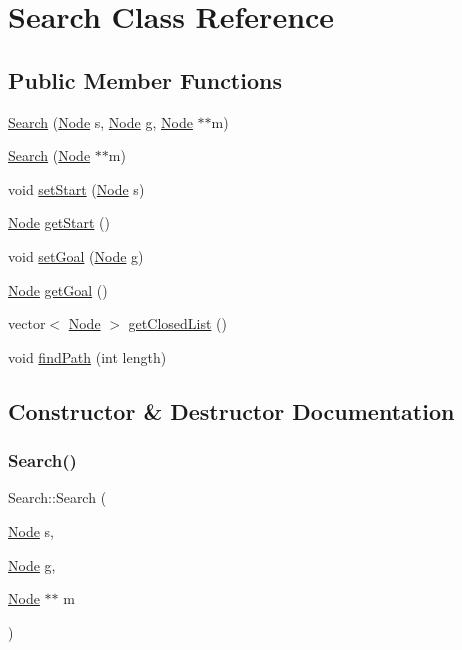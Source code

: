 \hypertarget{classSearch}{}\section{Search Class Reference}
\label{classSearch}
\subsection*{Public Member Functions}
\begin{DoxyCompactItemize}
\item 
\hyperlink{classSearch_a2998ad6a38a734499f2e1be4202b7fee}{Search} (\hyperlink{structNode}{Node} s, \hyperlink{structNode}{Node} g, \hyperlink{structNode}{Node} $\ast$$\ast$m)
\item 
\hyperlink{classSearch_aaac5fc9df8f0bf97f5344ee4c4f5486a}{Search} (\hyperlink{structNode}{Node} $\ast$$\ast$m)
\item 
void \hyperlink{classSearch_aac5b5b806c6283f2cc827ec14dac0ae3}{set\+Start} (\hyperlink{structNode}{Node} s)
\item 
\hyperlink{structNode}{Node} \hyperlink{classSearch_a4c59b1eff090896d91582d3cbe85c0f0}{get\+Start} ()
\item 
void \hyperlink{classSearch_adac3002d9754841372e39e249bc25981}{set\+Goal} (\hyperlink{structNode}{Node} g)
\item 
\hyperlink{structNode}{Node} \hyperlink{classSearch_a3a6f267df8e921ccb7feab65ad990948}{get\+Goal} ()
\item 
vector$<$ \hyperlink{structNode}{Node} $>$ \hyperlink{classSearch_a89084e77e24858c6edba6dd7b67b37ee}{get\+Closed\+List} ()
\item 
void \hyperlink{classSearch_a3ff4d1c82e4db3ef737baf1fff06490f}{find\+Path} (int length)
\end{DoxyCompactItemize}


\subsection{Constructor \& Destructor Documentation}
\mbox{\label{classSearch_a2998ad6a38a734499f2e1be4202b7fee}} 
\subsubsection{\texorpdfstring{Search()}{Search()}\hspace{0.1cm}{\footnotesize\ttfamily [1/2]}}
{\footnotesize\ttfamily Search\+::\+Search (\begin{DoxyParamCaption}\item[{\hyperlink{structNode}{Node}}]{s,  }\item[{\hyperlink{structNode}{Node}}]{g,  }\item[{\hyperlink{structNode}{Node} $\ast$$\ast$}]{m }\end{DoxyParamCaption})\hspace{0.3cm}{\ttfamily [inline]}}

